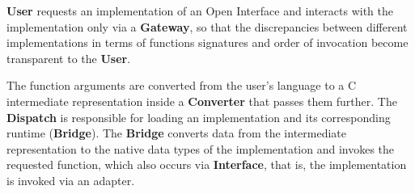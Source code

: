 \documentclass{mmposter}
\begin{document}
\textbf{User} requests an implementation of an Open Interface
and interacts with the implementation only via a \textbf{Gateway},
so that the discrepancies between different implementations in terms
of functions signatures and order of invocation become transparent
to the \textbf{User}.

The function arguments are converted from the user's language
to a C intermediate representation inside a \textbf{Converter}
that passes them further.
The \textbf{Dispatch} is responsible for loading an implementation
and its corresponding runtime (\textbf{Bridge}).
The \textbf{Bridge} converts data from the intermediate representation
to the native data types of the implementation and invokes
the requested function, which also occurs via \textbf{Interface},
that is, the implementation is invoked via an adapter.

\newpage
\end{document}
